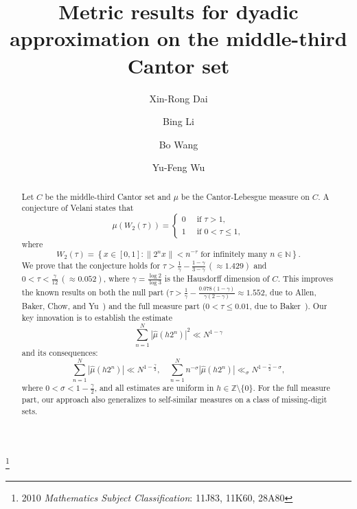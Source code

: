 \documentclass[amssymb,amsfonts,refcheck,12pt,verbatim,righttag]{amsart}
\numberwithin{equation}{section} %
\newcommand{\N}{\mathbb{N}}
\newcommand{\Z}{\mathbb{Z}}
\theoremstyle{plain}
\begin{document}
\baselineskip 16pt

\title{Metric results for dyadic approximation on the middle-third Cantor set}



\author{Xin-Rong Dai}
\author{Bing Li} 
\author{Bo Wang}
\author{Yu-Feng Wu}


\address[]{School of Mathematics, Sun Yat-sen University, Cuangzhou, 510275, P. R. China}

\address[]{School of Mathematics, South China University of Technology, Guangzhou,
	510641, P. R. China}


\address[]{School of Mathematics, Sun Yat-sen University, Cuangzhou, 510275, P. R. China \\ School of Mathematics, Jiaying University, Meizhou, 514015, P. R. China}

\address[]{School of Mathematics and Statistics\\HNP-LAMA\\Central South University\\ Changsha, 410083, P. R. China}


\thanks{2010 {\it Mathematics Subject Classification}: 11J83, 11K60, 28A80}

\begin{abstract}
Let $C$ be the middle-third Cantor set and $\mu$ be the Cantor-Lebesgue measure on $C$. A conjecture of Velani states that
\[\mu(W_2(\tau))=\begin{cases}
	0 \quad  \text{ if }\tau>1,\\
	1 \quad \text{ if }0<\tau\leq 1,
\end{cases}\]
where 
\[W_2(\tau)=\left\{x\in[0,1]: \|2^nx\|<n^{-\tau}\text{ for infinitely many }n\in \N\right\}.\]
We prove that the conjecture holds for  $\tau>\frac{1}{\gamma}-\frac{1-\gamma}{3-\gamma}\,(\approx 1.429)$
 and $0<\tau<\frac{\gamma}{12}\,(\approx 0.052)$, where $\gamma=\frac{\log2}{\log3}$ is the Hausdorff dimension of $C$. This improves the known results on both the null part ($\tau>\frac{1}{\gamma}-\frac{0.078(1-\gamma)}{\gamma(2-\gamma)}\approx 1.552$, due to Allen, Baker, Chow, and Yu~\cite{ABCY23A}) and the full measure part ($0<\tau\leq 0.01$, due to Baker~\cite{Baker25A}). Our key innovation is to establish the estimate
\[\sum_{n=1}^{N}|\widehat{\mu}(h2^n)|^2\ll N^{1-\gamma}\]
and its consequences: 
\[  \sum_{n=1}^{N}|\widehat{\mu}(h2^n)|\ll N^{1-\frac{\gamma}{2}},\quad  \sum_{n=1}^{N}n^{- \sigma}|\widehat{\mu}(h2^n)|\ll_{\sigma} N^{1-\frac{\gamma}{2}-\sigma},\]
where $0<\sigma<1-\frac{\gamma}{2}$, and all estimates are uniform in $h\in\Z\setminus\{0\}$. For the  full measure part, our approach also generalizes to self-similar measures on a class of missing-digit sets.
\end{abstract}
\end{document}
